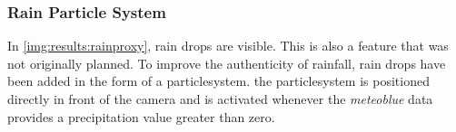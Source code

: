 \subsubsection{Rain Particle System}
In \autoref{img:results:rainproxy}, rain drops are visible. This is also a feature that was not originally planned.
To improve the authenticity of rainfall, rain drops have been added in the form of a \gls{particlesystem}.
the \gls{particlesystem} is positioned directly in front of the camera and is activated whenever the \emph{meteoblue} data provides a \gls{precipitation} value greater than zero.
